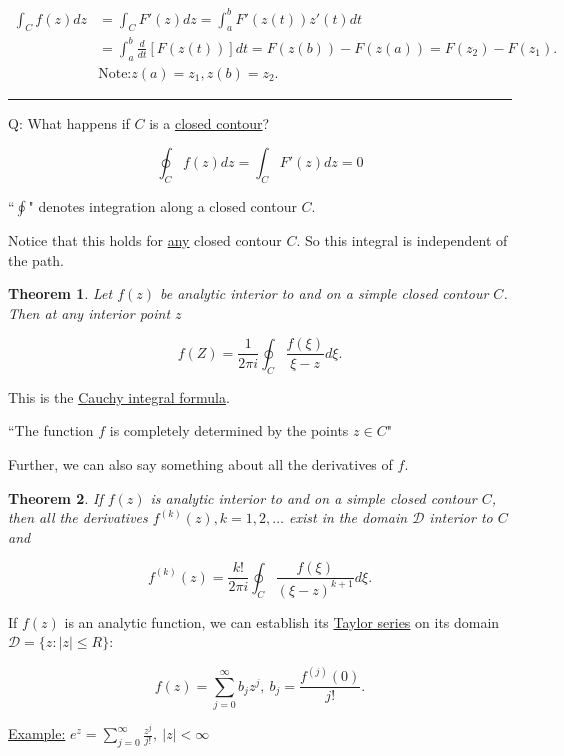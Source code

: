 \documentclass[twoside]{article}
\newcounter{lecnum}
\newtheorem{theorem}{Theorem}[lecnum]
\newenvironment{proof}{{\bf Proof:}}{\hfill\rule{2mm}{2mm}}
\begin{document}
\begin{proof}
	\begin{equation}
		\begin{split}
			\int_C f(z)dz&=\int_C F'(z)dz=\int^b_a F'(z(t))z'(t)dt\\
			&=\int^b_a \frac{d}{dt}[F(z(t))]dt= F(z(b))-F(z(a))=F(z_2)-F(z_1).\\
			&\text{Note:} z(a)=z_1, z(b)=z_2.
		\end{split}
	\end{equation}
\end{proof}

Q: What happens if $C$ is a \underline{closed contour}?

$$\oint_C f(z)dz = \int_C F'(z)dz=0$$

``$\oint$" denotes integration along a closed contour $C$.

Notice that this holds for \underline{any} closed contour $C$. So this integral is independent of the path.\\

\begin{theorem}
	Let $f(z)$ be analytic interior to and on a simple closed contour $C$. Then at any interior point $z$
	
	$$f(Z)=\frac{1}{2\pi i}\oint_C\frac{f(\xi)}{\xi -z}d\xi.$$
\end{theorem}

This is the \underline{Cauchy integral formula}.

``The function $f$ is completely determined by the points $z\in C$"

Further, we can also say something about all the derivatives of $f$.\\

\begin{theorem}
	If $f(z)$ is analytic interior to and on a simple closed contour $C$, then all the derivatives $f^{(k)}(z), k=1,2,\dots$ exist in the domain $\mathcal{D}$ interior to $C$ and
	
	$$f^{(k)}(z)=\frac{k!}{2\pi i}\oint_C\frac{f(\xi)}{(\xi-z)^{k+1}}d\xi.$$
	
\end{theorem}

If $f(z)$ is an analytic function, we can establish its \underline{Taylor series} on its domain $\mathcal{D}=\{z:\lvert z\rvert\leq R\}$:

$$f(z)=\sum^\infty_{j=0}b_jz^j,\ b_j=\frac{f^{(j)}(0)}{j!}.$$

\underline{Example:} $e^z=\sum^\infty_{j=0}\frac{z^j}{j!},\ \lvert z\rvert < \infty$\\
\end{document}
